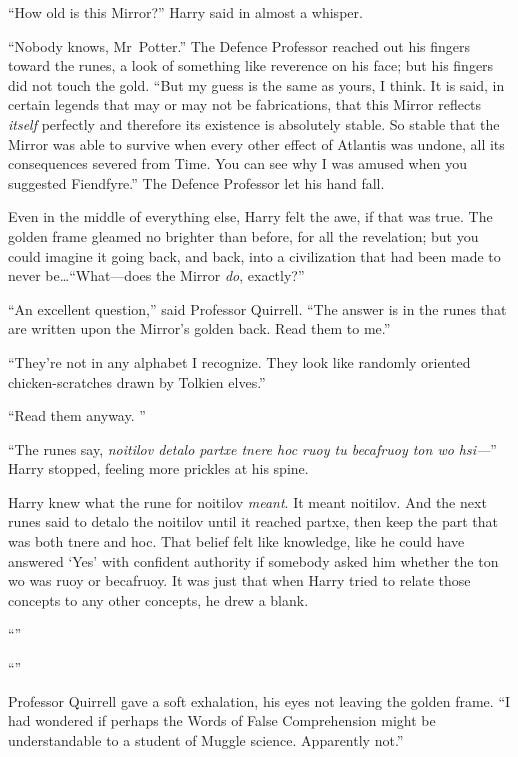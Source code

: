 “How old is this Mirror?” Harry said in almost a whisper.

“Nobody knows, Mr~Potter.” The Defence Professor reached out his fingers toward the runes, a look of something like reverence on his face; but his fingers did not touch the gold. “But my guess is the same as yours, I think. It is said, in certain legends that may or may not be fabrications, that this Mirror reflects \emph{itself} perfectly and therefore its existence is absolutely stable. So stable that the Mirror was able to survive when every other effect of Atlantis was undone, all its consequences severed from Time. You can see why I was amused when you suggested Fiendfyre.” The Defence Professor let his hand fall.

Even in the middle of everything else, Harry felt the awe, if that was true. The golden frame gleamed no brighter than before, for all the revelation; but you could imagine it going back, and back, into a civilization that had been made to never be…“What—does the Mirror \emph{do}, exactly?”

“An excellent question,” said Professor Quirrell. “The answer is in the runes that are written upon the Mirror’s golden back. Read them to me.”

“They’re not in any alphabet I recognize. They look like randomly oriented chicken-scratches drawn by Tolkien elves.”

“Read them anyway. ”

“The runes say, \emph{noitilov detalo partxe tnere hoc ruoy tu becafruoy ton wo hsi—}” Harry stopped, feeling more prickles at his spine.

Harry knew what the rune for noitilov \emph{meant}. It meant noitilov. And the next runes said to detalo the noitilov until it reached partxe, then keep the part that was both tnere and hoc. That belief felt like knowledge, like he could have answered ‘Yes’ with confident authority if somebody asked him whether the ton wo was ruoy or becafruoy. It was just that when Harry tried to relate those concepts to any other concepts, he drew a blank.

“”

“”

Professor Quirrell gave a soft exhalation, his eyes not leaving the golden frame. “I had wondered if perhaps the Words of False Comprehension might be understandable to a student of Muggle science. Apparently not.”

